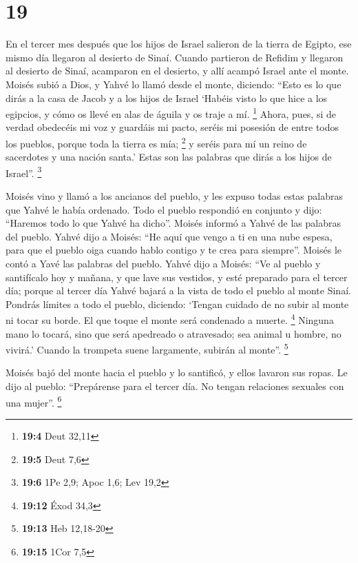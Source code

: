 \hypertarget{section-18}{%
\section{19}\label{section-18}}

 En el tercer mes después que los hijos de Israel salieron
de la tierra de Egipto, ese mismo día llegaron al desierto de Sinaí.
 Cuando partieron de Refidim y llegaron al desierto de
Sinaí, acamparon en el desierto, y allí acampó Israel ante el monte.
 Moisés subió a Dios, y Yahvé lo llamó desde el monte,
diciendo: ``Esto es lo que dirás a la casa de Jacob y a los hijos de
Israel  `Habéis visto lo que hice a los egipcios, y cómo
os llevé en alas de águila y os traje a mí. \footnote{\textbf{19:4} Deut
  32,11}  Ahora, pues, si de verdad obedecéis mi voz y
guardáis mi pacto, seréis mi posesión de entre todos los pueblos, porque
toda la tierra es mía; \footnote{\textbf{19:5} Deut 7,6} 
y seréis para mí un reino de sacerdotes y una nación santa.' Estas son
las palabras que dirás a los hijos de Israel''. \footnote{\textbf{19:6}
  1Pe 2,9; Apoc 1,6; Lev 19,2}

 Moisés vino y llamó a los ancianos del pueblo, y les
expuso todas estas palabras que Yahvé le había ordenado. 
Todo el pueblo respondió en conjunto y dijo: ``Haremos todo lo que Yahvé
ha dicho''. Moisés informó a Yahvé de las palabras del pueblo.
 Yahvé dijo a Moisés: ``He aquí que vengo a ti en una nube
espesa, para que el pueblo oiga cuando hablo contigo y te crea para
siempre''. Moisés le contó a Yavé las palabras del pueblo.
 Yahvé dijo a Moisés: ``Ve al pueblo y santifícalo hoy y
mañana, y que lave sus vestidos,  y esté preparado para
el tercer día; porque al tercer día Yahvé bajará a la vista de todo el
pueblo al monte Sinaí.  Pondrás límites a todo el pueblo,
diciendo: `Tengan cuidado de no subir al monte ni tocar su borde. El que
toque el monte será condenado a muerte. \footnote{\textbf{19:12} Éxod
  34,3}  Ninguna mano lo tocará, sino que será apedreado
o atravesado; sea animal u hombre, no vivirá.' Cuando la trompeta suene
largamente, subirán al monte''. \footnote{\textbf{19:13} Heb 12,18-20}

 Moisés bajó del monte hacia el pueblo y lo santificó, y
ellos lavaron sus ropas.  Le dijo al pueblo: ``Prepárense
para el tercer día. No tengan relaciones sexuales con una mujer''.
\footnote{\textbf{19:15} 1Cor 7,5}

